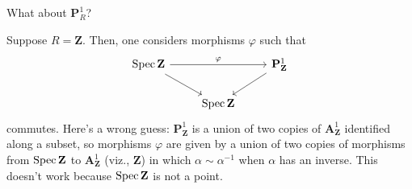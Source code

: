 \documentclass [11 pt, oneside] {article}
\begin{document}
\begin{problem}
	What about $\mathbf{P}^1_{R}$?
\end{problem}

\begin{example}[ ]\label{}\text{}
Suppose $R=\mathbf{Z}$. Then, one considers morphisms $\varphi$ such that
\[
\begin{tikzcd}
	\Spec \mathbf{Z} \ar[rd]\ar[rr,"\varphi"] &&\mathbf{P}^1_{\mathbf{Z}}\ar[ld]\\
						  &\Spec \mathbf{Z}
\end{tikzcd}
\]
commutes.
Here's a wrong guess: $\mathbf{P}^1_{\mathbf{Z}}$ is a union of two copies of $\mathbf{A}^1_{\mathbf{Z}}$ identified along a subset, so morphisms $\varphi$ are given by a union of two copies of morphisms from $\operatorname{Spec} \mathbf{Z}$ to $\mathbf{A}^1_{\mathbf{Z}}$ (viz., $\mathbf{Z}$) in which $\alpha\sim \alpha^{-1}$ when $\alpha$ has an inverse. This doesn't work because $\operatorname{Spec} \mathbf{Z}$ is not a point.


\end{example}
\end{document}
